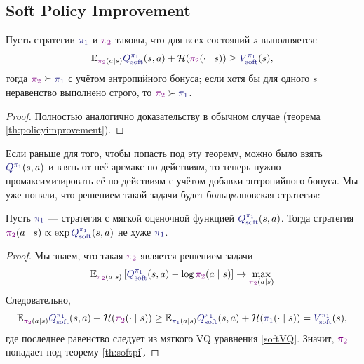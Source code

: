 \subsection{Soft Policy Improvement}

\begin{theoremBox}[label=th:softpi]{}
Пусть стратегии $\textcolor{ChadBlue}{\pi_1}$ и $\textcolor{ChadPurple}{\pi_2}$ таковы, что для всех состояний $s$ выполняется:
$$\E_{\textcolor{ChadPurple}{\pi_2}(a \mid s)} \textcolor{ChadBlue}{Q^{\pi_1}_{\soft}}(s, a) + \mathcal{H}(\textcolor{ChadPurple}{\pi_2}(\cdot \mid s)) \ge \textcolor{ChadBlue}{V^{\pi_1}_{\soft}}(s),$$
тогда $\textcolor{ChadPurple}{\pi_2} \succeq \textcolor{ChadBlue}{\pi_1}$ с учётом энтропийного бонуса; если хотя бы для одного $s$ неравенство выполнено строго, то $\textcolor{ChadPurple}{\pi_2} \succ \textcolor{ChadBlue}{\pi_1}$.
\begin{proof}
Полностью аналогично доказательству в обычном случае (теорема \ref{th:policyimprovement}).
\end{proof}
\end{theoremBox}

Если раньше для того, чтобы попасть под эту теорему, можно было взять $\textcolor{ChadBlue}{Q^{\pi_1}}(s, a)$ и взять от неё аргмакс по действиям, то теперь нужно промаксимизировать её по действиям с учётом добавки энтропийного бонуса. Мы уже поняли, что решением такой задачи будет больцмановская стратегия:

\begin{theorem}
Пусть $\textcolor{ChadBlue}{\pi_1}$ --- стратегия с мягкой оценочной функцией $\textcolor{ChadBlue}{Q^{\pi_1}_{\soft}}(s, a)$. Тогда стратегия $\textcolor{ChadPurple}{\pi_2}(a \mid s) \propto \exp \textcolor{ChadBlue}{Q^{\pi_1}_{\soft}}(s, a)$ не хуже $\textcolor{ChadBlue}{\pi_1}$.
\begin{proof}
Мы знаем, что такая $\textcolor{ChadPurple}{\pi_2}$ является решением задачи
$$\E_{\textcolor{ChadPurple}{\pi_2}(a \mid s)} \left[ \textcolor{ChadBlue}{Q^{\pi_1}_{\soft}}(s, a) - \log \textcolor{ChadPurple}{\pi_2}(a \mid s) \right] \to \max\limits_{\textcolor{ChadPurple}{\pi_2}(a \mid s)}
$$
Следовательно,
$$\E_{\textcolor{ChadPurple}{\pi_2}(a \mid s)} \textcolor{ChadBlue}{Q^{\pi_1}_{\soft}}(s, a) + \mathcal{H}(\textcolor{ChadPurple}{\pi_2}(\cdot \mid s)) \ge \E_{\textcolor{ChadBlue}{\pi_1}(a \mid s)} \textcolor{ChadBlue}{Q^{\pi_1}_{\soft}}(s, a) + \mathcal{H}(\textcolor{ChadBlue}{\pi_1}(\cdot \mid s)) = \textcolor{ChadBlue}{V^{\pi_1}_{\soft}}(s),$$
где последнее равенство следует из мягкого VQ уравнения \eqref{softVQ}. Значит, $\textcolor{ChadPurple}{\pi_2}$ попадает под теорему \ref{th:softpi}.
\end{proof}
\end{theorem}

